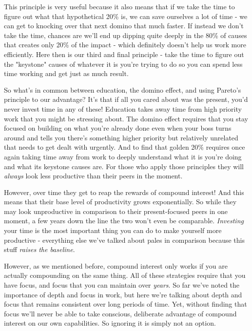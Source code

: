 \documentclass[11pt,a5paper]{book}
\begin{document}
This principle is very useful because it also means that if we take the time to figure out what that hypothetical 20\% is, we can save ourselves a lot of time - we can get to knocking over that next domino that much faster. If instead we don't take the time, chances are we'll end up dipping quite deeply in the 80\% of causes that creates only 20\% of the impact - which definitely doesn't help us work more efficiently. Here then is our third and final principle - take the time to figure out the "keystone" causes of whatever it is you're trying to do so you can spend less time working and get just as much result.
\newline

So what's in common between education, the domino effect, and using Pareto's principle to our advantage? It's that if all you cared about was the present, you'd never invest time in any of these! Education takes away time from high priority work that you might be stressing about. The domino effect requires that you stay focused on building on what you're already done even when your boss turns around and tells you there's something higher priority but relatively unrelated that needs to get dealt with urgently. And to find that golden 20\% requires once again taking time away from work to deeply understand what it is you're doing and what its keystone causes are. For those who apply those principles they will \textit{always} look less productive than their peers in the moment. 
\newline

However, over time they get to reap the rewards of compound interest! And this means that their base level of productivity grows exponentially. So while they may look unproductive in comparison to their present-focused peers in one moment, a few years down the line the two won't even be comparable. \textit{Investing} your time is the most important thing you can do to make yourself more productive - everything else we've talked about pales in comparison because this stuff \textit{raises the baseline}. 
\newline

However, as we mentioned before, compound interest only works if you are actually compounding on the same thing. All of these strategies require that you have focus, and focus that you can maintain over \textit{years}. So far we've noted the importance of depth and focus in work, but here we're talking about depth and focus that remains consistent over long periods of time. Yet, without finding that focus we'll never be able to take conscious, deliberate advantage of compound interest on our own capabilities. So ignoring it is simply not an option.  
\end{document}
